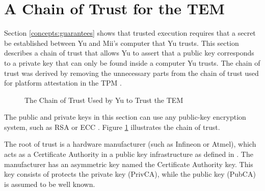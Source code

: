 \section{A Chain of Trust for the TEM}\label{concepts:trust_chain}

Section \ref{concepts:guarantees} shows that trusted execution requires that a
secret be established between Yu and Mii's computer that Yu trusts. This
section describes a chain of trust that allows Yu to assert that a public key
corresponds to a private key that can only be found inside a computer Yu
trusts. The chain of trust was derived by removing the unnecessary parts from
the chain of trust used for platform attestation in the TPM \cite{tcpa2007}.

\begin{figure}[bhp]
	\caption{The Chain of Trust Used by Yu to Trust the TEM }
	\label{fig:trust_chain}
\end{figure}

The public and private keys in this section can use any public-key encryption
system, such as RSA \cite{rivest1978mod} or ECC \cite{koblitz1987ecc}. Figure
\ref{fig:trust_chain} illustrates the chain of trust.

The root of trust is a hardware manufacturer (such as Infineon or Atmel), which
acts as a Certificate Authority in a public key infrastructure as defined in
\cite{housley2002ixp}. The manufacturer has an asymmetric key named the
Certificate Authority key. This key consists of protects the private key
(PrivCA), while the public key (PubCA) is assumed to be well known.

